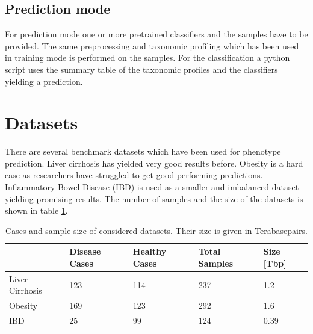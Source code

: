 \subsection{Prediction mode}
For prediction mode one or more pretrained classifiers and the samples have to be provided. The same preprocessing and taxonomic profiling which has been used in training mode is performed on the samples. For the classification a python script uses the summary table of the taxonomic profiles and the classifiers yielding a prediction. 


\section{Datasets}

There are several benchmark datasets which have been used for phenotype prediction.  Liver cirrhosis has yielded very good results before. Obesity is a hard case as researchers have struggled to get good performing predictions. Inflammatory Bowel Disease (IBD) is used as a smaller and imbalanced dataset yielding promising results. The number of samples and the size of the datasets is shown in table \ref{tab:datasets}. 


\begin{table}[]
	\centering
	\caption{Cases and sample size of considered datasets. Their size is given in Terabasepairs.}
	\label{tab:datasets}
	\begin{tabular}{lllll}
		\hline
		& Disease Cases & Healthy Cases & Total Samples & Size {[}Tbp{]} \\ \hline
		Liver Cirrhosis & 123     & 114    & 237   & 1.2            \\
		Obesity         & 169     & 123    & 292   & 1.6            \\
		IBD             & 25      & 99     & 124   & 0.39           \\ \hline
	\end{tabular}
\end{table}
